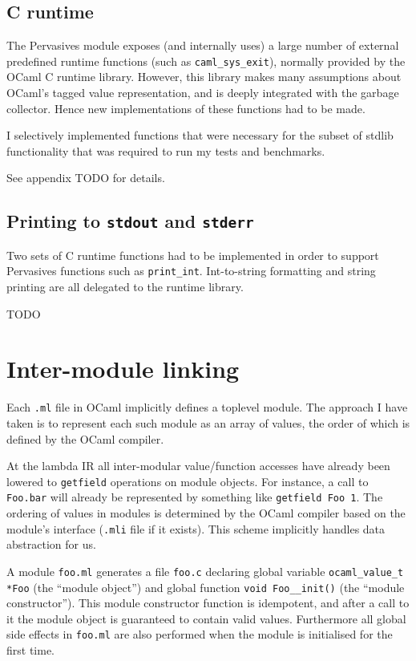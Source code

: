 \documentclass[12pt,a4paper,twoside,openright]{report}
\begin{document}
\subsection{C runtime}

The Pervasives module exposes (and internally uses) a large number of external
predefined runtime functions (such as \lstinline!caml_sys_exit!), normally
provided by the OCaml C runtime library. However, this library makes many
assumptions about OCaml's tagged value representation, and is deeply integrated
with the garbage collector. Hence new implementations of these functions had to
be made.

I selectively implemented functions that were necessary for the subset of
stdlib functionality that was required to run my tests and benchmarks.

See appendix TODO for details.

\subsection{Printing to \texttt{stdout} and \texttt{stderr}}

Two sets of C runtime functions had to be implemented in order to support
Pervasives functions such as \lstinline!print_int!. Int-to-string formatting
and string printing are all delegated to the runtime library.

TODO

\section{Inter-module linking}

Each \lstinline!.ml! file in OCaml implicitly defines a toplevel module. The
approach I have taken is to represent each such module as an array of values,
the order of which is defined by the OCaml compiler.

At the lambda IR all inter-modular value/function accesses have already been
lowered to \lstinline!getfield! operations on module objects. For instance, a
call to \lstinline!Foo.bar! will already be represented by something like
\lstinline!getfield Foo 1!. The ordering of values in modules is determined by
the OCaml compiler based on the module's interface (\lstinline!.mli! file if it
exists). This scheme implicitly handles data abstraction for us.

A module \lstinline!foo.ml! generates a file \lstinline!foo.c! declaring global
variable \lstinline!ocaml_value_t *Foo! (the ``module object'') and global
function \lstinline!void Foo__init()! (the ``module constructor''). This module
constructor function is idempotent, and after a call to it the module object is
guaranteed to contain valid values. Furthermore all global side effects in
\lstinline!foo.ml! are also performed when the module is initialised for the
first time.
\end{document}
